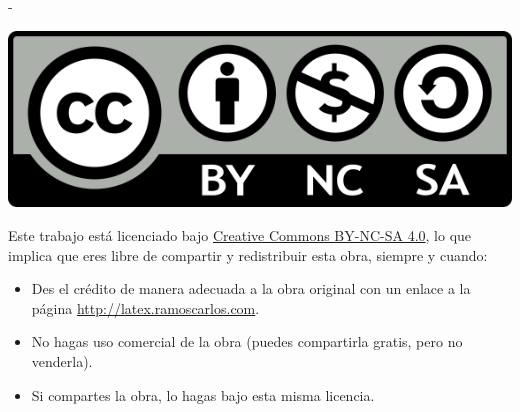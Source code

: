 {\begin{adjustwidth}{-\margenAdicional}{}
\vspace*{1cm}

\noindent\begin{minipage}[t]{2cm}
\includegraphics[width=\linewidth]{img/CC-BY-NC-SA.png}
\end{minipage}
\begin{minipage}[t]{\linewidth-2cm}
\vspace{-19.5pt}
Este trabajo está licenciado bajo \href{https://creativecommons.org/licenses/by-nc-sa/4.0/deed.es}{Creative Commons BY-NC-SA 4.0}, lo que implica que eres libre de compartir y redistribuir esta obra, siempre y cuando:
\begin{itemize}[nosep]
    \item Des el crédito de manera adecuada a la obra original con un enlace a la página \url{http://latex.ramoscarlos.com}.
    \item No hagas uso comercial de la obra (puedes compartirla gratis, pero no venderla).
    \item Si compartes la obra, lo hagas bajo esta misma licencia.
\end{itemize}
\end{minipage}

\end{adjustwidth}
}